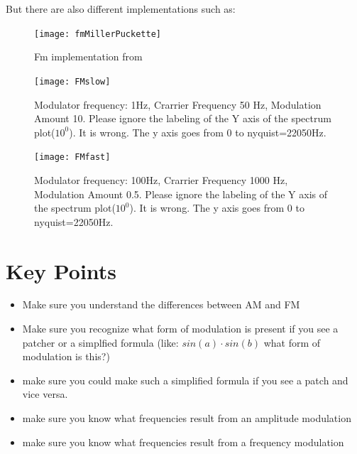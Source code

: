 {But there are also different implementations such as:
\begin{figure}[H]
	\centering
	\texttt{[image: fmMillerPuckette]}
	\caption[miller Puckette FM]
	{Fm implementation from \cite{miller_puckette_theory_2006}}
	\label{fig:label}
\end{figure}



}

\begin{figure}[h!]
	\centering
	\texttt{[image: FMslow]}
	\caption[FM visualization, low freq]
	{Modulator frequency: 1Hz, Crarrier Frequency 50 Hz, Modulation Amount 10. Please ignore the labeling of the Y axis of the spectrum plot($10^0$). It is wrong. The y axis goes from 0 to nyquist=22050Hz.}
	\label{fig:fmSlow}
\end{figure}


\begin{figure}[H]
	\centering
	\texttt{[image: FMfast]}
	\caption[FM visualization, hi freq]
	{Modulator frequency: 100Hz, Crarrier Frequency 1000 Hz, Modulation Amount 0.5. Please ignore the labeling of the Y axis of the spectrum plot($10^0$). It is wrong. The y axis goes from 0 to nyquist=22050Hz.}
	\label{fig:fmFast}
\end{figure}


\section{Key Points}
\begin{itemize}
	\item Make sure you understand the differences between AM and FM
	\item Make sure you recognize what form of modulation is present if you see a patcher or a simplfied formula (like: $sin(a) \cdot sin(b)$ what form of modulation is this?)
	\item make sure you could make such a simplified formula if you see a patch and vice versa.
	\item make sure you know what frequencies result from an amplitude modulation
	\item make sure you know what frequencies result from a frequency modulation
\end{itemize}

